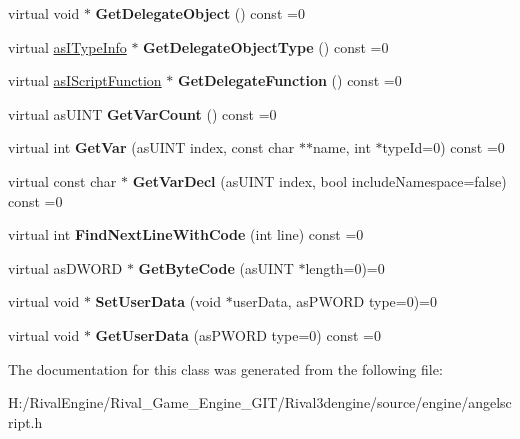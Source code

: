\begin{DoxyCompactItemize}
virtual void $\ast$ {\bfseries Get\+Delegate\+Object} () const =0
\item 
\mbox{\label{classas_i_script_function_ad79461f80fcffd513b43564d75cc5360}} 
virtual \hyperlink{classas_i_type_info}{as\+I\+Type\+Info} $\ast$ {\bfseries Get\+Delegate\+Object\+Type} () const =0
\item 
\mbox{\label{classas_i_script_function_aa28f4e68da8abb770d7f725375bcd2bb}} 
virtual \hyperlink{classas_i_script_function}{as\+I\+Script\+Function} $\ast$ {\bfseries Get\+Delegate\+Function} () const =0
\item 
\mbox{\label{classas_i_script_function_a92e14168997c0f67a975e7ed042d8328}} 
virtual as\+U\+I\+NT {\bfseries Get\+Var\+Count} () const =0
\item 
\mbox{\label{classas_i_script_function_aaf11dde60bec710bcd729127bfe12dd4}} 
virtual int {\bfseries Get\+Var} (as\+U\+I\+NT index, const char $\ast$$\ast$name, int $\ast$type\+Id=0) const =0
\item 
\mbox{\label{classas_i_script_function_acef067f00f2a6a997d6955f5cf3c6d13}} 
virtual const char $\ast$ {\bfseries Get\+Var\+Decl} (as\+U\+I\+NT index, bool include\+Namespace=false) const =0
\item 
\mbox{\label{classas_i_script_function_a30dc23991856a13f59e682b3b1498e2f}} 
virtual int {\bfseries Find\+Next\+Line\+With\+Code} (int line) const =0
\item 
\mbox{\label{classas_i_script_function_afb38e9ba77ce8b49378e43dadd83ef94}} 
virtual as\+D\+W\+O\+RD $\ast$ {\bfseries Get\+Byte\+Code} (as\+U\+I\+NT $\ast$length=0)=0
\item 
\mbox{\label{classas_i_script_function_a9dd036ce8e91d335eb5a3ad8851f1a41}} 
virtual void $\ast$ {\bfseries Set\+User\+Data} (void $\ast$user\+Data, as\+P\+W\+O\+RD type=0)=0
\item 
\mbox{\label{classas_i_script_function_a0d0d4671e524fcd868a34bee33ee9fde}} 
virtual void $\ast$ {\bfseries Get\+User\+Data} (as\+P\+W\+O\+RD type=0) const =0
\end{DoxyCompactItemize}


The documentation for this class was generated from the following file\+:\begin{DoxyCompactItemize}
\item 
H\+:/\+Rival\+Engine/\+Rival\+\_\+\+Game\+\_\+\+Engine\+\_\+\+G\+I\+T/\+Rival3dengine/source/engine/angelscript.\+h\end{DoxyCompactItemize}
